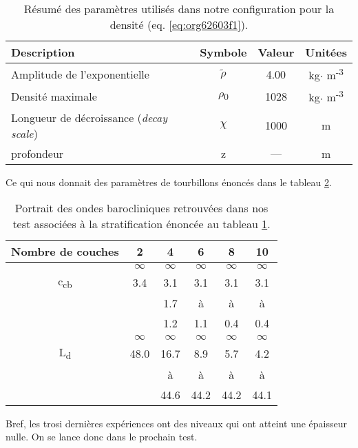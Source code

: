 \documentclass[10pt]{report}
\numberwithin{equation}{section}
\begin{document}
\begin{table}[htbp]
\caption{\label{tab:orge0439a8}Résumé des paramètres utilisés dans notre configuration pour la densité (eq. \ref{eq:org62603f1}).}
\centering
\begin{tabular}{lccc}
\hline
\hline
Description & Symbole & Valeur & Unitées\\[0pt]
\hline
Amplitude de l'exponentielle & \(\tilde{\rho}\) & 4.00 & kg\(\cdot\) m\textsuperscript{-3}\\[0pt]
Densité maximale & \(\rho\)\textsubscript{0} & 1028 & kg\(\cdot\) m\textsuperscript{-3}\\[0pt]
Longueur de décroissance (\emph{decay scale}) & \(\chi\) & 1000 & m\\[0pt]
profondeur & z & --- & m\\[0pt]
\hline
\end{tabular}
\end{table}

Ce qui nous donnait des paramètres de tourbillons énoncés dans le tableau \ref{tab:org5a36f29}. 

\begin{table}[htbp]
\caption{\label{tab:org5a36f29}Portrait des ondes barocliniques retrouvées dans nos test  associées à la stratification énoncée au tableau \ref{tab:orge0439a8}.}
\centering
\begin{tabular}{cccccc}
\hline
\hline
Nombre de couches & 2 & 4 & 6 & 8 & 10\\[0pt]
\hline
 & \(\infty\) & \(\infty\) & \(\infty\) & \(\infty\) & \(\infty\)\\[0pt]
c\textsubscript{cb} & 3.4 & 3.1 & 3.1 & 3.1 & 3.1\\[0pt]
[m\(\cdot\) s\textsuperscript{-1}] &  & 1.7 & à & à & à\\[0pt]
 &  & 1.2 & 1.1 & 0.4 & 0.4\\[0pt]
\hline
 & \(\infty\) & \(\infty\) & \(\infty\) & \(\infty\) & \(\infty\)\\[0pt]
L\textsubscript{d} & 48.0 & 16.7 & 8.9 & 5.7 & 4.2\\[0pt]
[km] &  & à & à & à & à\\[0pt]
 &  & 44.6 & 44.2 & 44.2 & 44.1\\[0pt]
\hline
\end{tabular}
\end{table}

Bref, les trosi dernières expériences ont des niveaux qui ont atteint une épaisseur nulle.
On se lance donc dans le prochain test.
\end{document}
